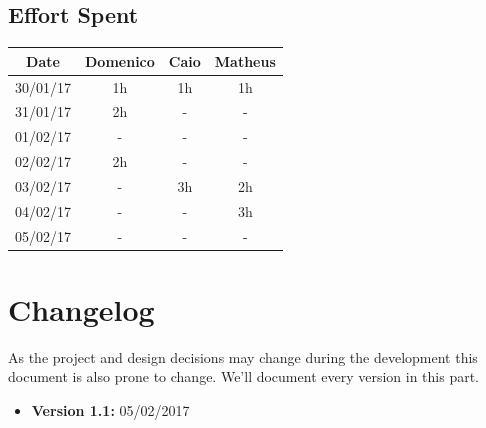 \documentclass[a4paper]{article}
\begin{document}
\newpage
\subsection{Effort Spent}
\begin{tabular}{ | c | c | c | c | }
\hline
	\textbf {Date} & \textbf {Domenico} & \textbf {Caio} & \textbf {Matheus} \\ \hline
	30/01/17& 1h & 1h & 1h  \\ \hline
	31/01/17& 2h & - & -  \\ \hline
	01/02/17& - & - & -  \\ \hline
	02/02/17& 2h & - & -  \\ \hline
	03/02/17& - & 3h& 2h  \\ \hline
	04/02/17& - & - & 3h \\ \hline
	05/02/17& - & - & -  \\ \hline

\end{tabular}
\newpage

\section{Changelog}
As the project and design decisions may change during the development this document is also prone to change.
We'll document every version in this part.
\begin{itemize}
\item \textbf {Version 1.1:} 05/02/2017
\end{itemize}
\end{document}
